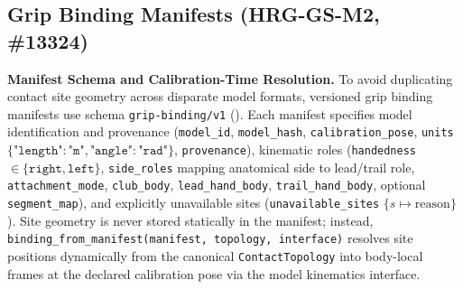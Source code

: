 \documentclass[11pt,a4paper]{article}
\begin{document}
\subsection{Grip Binding Manifests (HRG-GS-M2, \#13324)}
\textbf{Manifest Schema and Calibration-Time Resolution.}
To avoid duplicating contact site geometry across disparate model formats, versioned grip binding manifests use schema \texttt{grip-binding/v1} (). Each manifest specifies model identification and provenance (\texttt{model\_id}, \texttt{model\_hash}, \texttt{calibration\_pose}, \texttt{units} $\{ \texttt{"length"}\!: \texttt{"m"}, \texttt{"angle"}\!: \texttt{"rad"} \}$, \texttt{provenance}), kinematic roles (\texttt{handedness} $\in \{\texttt{right}, \texttt{left}\}$, \texttt{side\_roles} mapping anatomical side to lead/trail role, \texttt{attachment\_mode}, \texttt{club\_body}, \texttt{lead\_hand\_body}, \texttt{trail\_hand\_body}, optional \texttt{segment\_map}), and explicitly unavailable sites (\texttt{unavailable\_sites} $\{ s \mapsto \text{reason} \}$).
Site geometry is never stored statically in the manifest; instead, \texttt{binding\_from\_manifest(manifest, topology, interface)} resolves site positions dynamically from the canonical \texttt{ContactTopology} into body-local frames at the declared calibration pose via the model kinematics interface.
\end{document}
